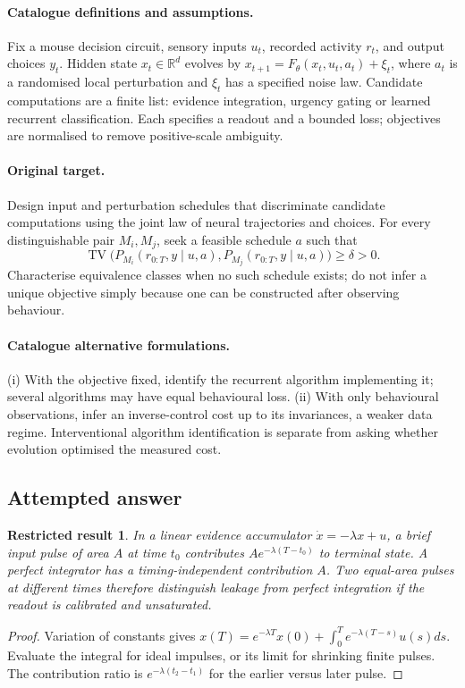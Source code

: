 \documentclass[11pt]{article}
\newcommand{\R}{\mathbb R}
\providecommand{\R}{\mathbb R}
\newtheorem{attemptresult}{Restricted result}[section]
\begin{document}
\paragraph{Catalogue definitions and assumptions.}
Fix a mouse decision circuit, sensory inputs $u_t$, recorded activity $r_t$, and output choices $y_t$. Hidden state $x_t\in\R^d$ evolves by $x_{t+1}=F_\theta(x_t,u_t,a_t)+\xi_t$, where $a_t$ is a randomised local perturbation and $\xi_t$ has a specified noise law. Candidate computations are a finite list: evidence integration, urgency gating or learned recurrent classification. Each specifies a readout and a bounded loss; objectives are normalised to remove positive-scale ambiguity.
\paragraph{Original target.}
Design input and perturbation schedules that discriminate candidate computations using the joint law of neural trajectories and choices. For every distinguishable pair $M_i,M_j$, seek a feasible schedule $a$ such that
\[
\operatorname{TV}\bigl(P_{M_i}(r_{0:T},y\mid u,a),P_{M_j}(r_{0:T},y\mid u,a)\bigr)\geq\delta>0.
\]
Characterise equivalence classes when no such schedule exists; do not infer a unique objective simply because one can be constructed after observing behaviour.
\paragraph{Catalogue alternative formulations.}
(i) With the objective fixed, identify the recurrent algorithm implementing it; several algorithms may have equal behavioural loss. (ii) With only behavioural observations, infer an inverse-control cost up to its invariances, a weaker data regime. Interventional algorithm identification is separate from asking whether evolution optimised the measured cost.
\subsection{Attempted answer}
\begin{attemptresult}
In a linear evidence accumulator $\dot x=-\lambda x+u$, a brief input pulse of area $A$ at time $t_0$ contributes $Ae^{-\lambda(T-t_0)}$ to terminal state. A perfect integrator has a timing-independent contribution $A$. Two equal-area pulses at different times therefore distinguish leakage from perfect integration if the readout is calibrated and unsaturated.
\end{attemptresult}
\begin{proof}
Variation of constants gives $x(T)=e^{-\lambda T}x(0)+\int_0^Te^{-\lambda(T-s)}u(s)ds$. Evaluate the integral for ideal impulses, or its limit for shrinking finite pulses. The contribution ratio is $e^{-\lambda(t_2-t_1)}$ for the earlier versus later pulse.
\end{proof}
\end{document}
